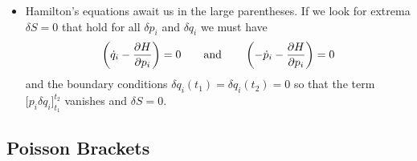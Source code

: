 \documentclass[11pt, a4paper]{article}
\newcommand{\eqtext}[1]{\qquad \text{#1} \qquad}
\begin{document}
\begin{itemize}
	\item Hamilton's equations await us in the large parentheses. If we look for extrema $ \delta S = 0 $ that hold for all $ \delta p_{i} $ and $ \delta q_{i} $ we must have
	\begin{equation*}
		\left(\dot{q}_{i} - \pdv{H}{p_{i}}\right) = 0 \eqtext{and} \left(-\dot{p}_{i} - \pdv{H}{p_{i}}\right) = 0
	\end{equation*}
	and the boundary conditions $ \delta q_{i}(t_{1}) = \delta q_{i}(t_{2}) = 0 $ so that the term $ \big[p_{i}\delta q_{i} \big]_{t_{1}}^{t_{2}} $ vanishes and $ \delta S = 0 $.
\end{itemize}



\subsection{Poisson Brackets}
\end{document}
